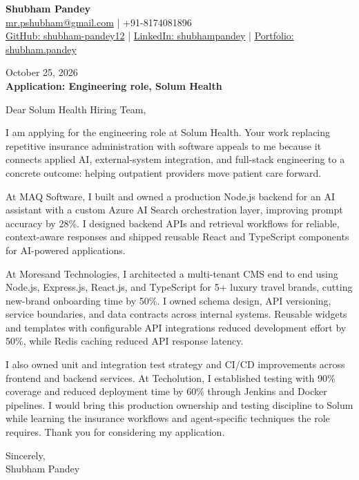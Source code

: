 \documentclass[a4paper,10pt]{article}
\begin{document}
\begin{center}
{\LARGE\textbf{Shubham Pandey}}\\[3pt]
\href{mailto:mr.pshubham@gmail.com}{mr.pshubham@gmail.com} | +91-8174081896\\[2pt]
\href{https://github.com/shubham-pandey12}{GitHub: shubham-pandey12} | \href{https://www.linkedin.com/in/shubham-pandey-a74716199/}{LinkedIn: shubhampandey} | \href{https://shubham-portfolio-mocha.vercel.app/}{Portfolio: shubham.pandey}
\end{center}
October 25, 2026\\[6pt]
\textbf{Application: Engineering role, Solum Health}

\vspace{12pt}
Dear Solum Health Hiring Team,

\vspace{6pt}
I am applying for the engineering role at Solum Health. Your work replacing repetitive insurance administration with software appeals to me because it connects applied AI, external-system integration, and full-stack engineering to a concrete outcome: helping outpatient providers move patient care forward.

\vspace{6pt}
At MAQ Software, I built and owned a production Node.js backend for an AI assistant with a custom Azure AI Search orchestration layer, improving prompt accuracy by 28\%. I designed backend APIs and retrieval workflows for reliable, context-aware responses and shipped reusable React and TypeScript components for AI-powered applications.

\vspace{6pt}
At Moresand Technologies, I architected a multi-tenant CMS end to end using Node.js, Express.js, React.js, and TypeScript for 5+ luxury travel brands, cutting new-brand onboarding time by 50\%. I owned schema design, API versioning, service boundaries, and data contracts across internal systems. Reusable widgets and templates with configurable API integrations reduced development effort by 50\%, while Redis caching reduced API response latency.

\vspace{6pt}
I also owned unit and integration test strategy and CI/CD improvements across frontend and backend services. At Techolution, I established testing with 90\% coverage and reduced deployment time by 60\% through Jenkins and Docker pipelines. I would bring this production ownership and testing discipline to Solum while learning the insurance workflows and agent-specific techniques the role requires. Thank you for considering my application.

\vspace{6pt}
Sincerely,\\[4pt]Shubham Pandey
\end{document}

